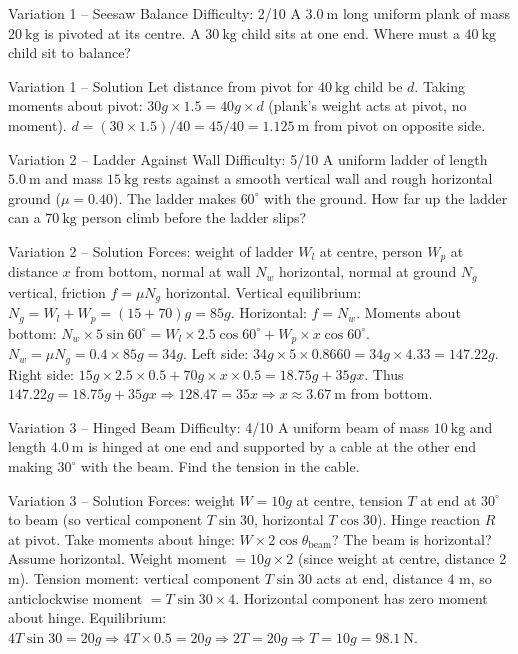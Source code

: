 \documentclass[11pt]{beamer}
\begin{document}
\begin{frame}[shrink=15]{Variation 1 – Seesaw Balance \hfill Difficulty: 2/10}
A $3.0\ \mathrm{m}$ long uniform plank of mass $20\ \mathrm{kg}$ is pivoted at its centre. A $30\ \mathrm{kg}$ child sits at one end. Where must a $40\ \mathrm{kg}$ child sit to balance?
\end{frame}

\begin{frame}{Variation 1 – Solution}
Let distance from pivot for $40\ \mathrm{kg}$ child be $d$. Taking moments about pivot:
$30g \times 1.5 = 40g \times d$ (plank's weight acts at pivot, no moment).
$d = (30\times1.5)/40 = 45/40 = 1.125\ \mathrm{m}$ from pivot on opposite side.
\end{frame}

\begin{frame}[shrink=15]{Variation 2 – Ladder Against Wall \hfill Difficulty: 5/10}
A uniform ladder of length $5.0\ \mathrm{m}$ and mass $15\ \mathrm{kg}$ rests against a smooth vertical wall and rough horizontal ground ($\mu = 0.40$). The ladder makes $60^\circ$ with the ground. How far up the ladder can a $70\ \mathrm{kg}$ person climb before the ladder slips?
\end{frame}

\begin{frame}[shrink=15]{Variation 2 – Solution}
Forces: weight of ladder $W_l$ at centre, person $W_p$ at distance $x$ from bottom, normal at wall $N_w$ horizontal, normal at ground $N_g$ vertical, friction $f = \mu N_g$ horizontal.
Vertical equilibrium: $N_g = W_l + W_p = (15+70)g = 85g$.
Horizontal: $f = N_w$.
Moments about bottom: $N_w \times 5\sin60^\circ = W_l \times 2.5\cos60^\circ + W_p \times x\cos60^\circ$.
$N_w = \mu N_g = 0.4\times85g = 34g$.
Left side: $34g \times 5\times0.8660 = 34g \times 4.33 = 147.22g$.
Right side: $15g \times 2.5\times0.5 + 70g \times x\times0.5 = 18.75g + 35g x$.
Thus $147.22g = 18.75g + 35g x \Rightarrow 128.47 = 35x \Rightarrow x \approx 3.67\ \mathrm{m}$ from bottom.
\end{frame}

\begin{frame}[shrink=15]{Variation 3 – Hinged Beam \hfill Difficulty: 4/10}
A uniform beam of mass $10\ \mathrm{kg}$ and length $4.0\ \mathrm{m}$ is hinged at one end and supported by a cable at the other end making $30^\circ$ with the beam. Find the tension in the cable.
\end{frame}

\begin{frame}{Variation 3 – Solution}
Forces: weight $W = 10g$ at centre, tension $T$ at end at $30^\circ$ to beam (so vertical component $T\sin30$, horizontal $T\cos30$). Hinge reaction $R$ at pivot. Take moments about hinge: $W \times 2\cos\theta_{\text{beam}}$? The beam is horizontal? Assume horizontal. Weight moment $= 10g \times 2$ (since weight at centre, distance 2 m). Tension moment: vertical component $T\sin30$ acts at end, distance $4$ m, so anticlockwise moment $= T\sin30 \times 4$. Horizontal component has zero moment about hinge. Equilibrium: $4T\sin30 = 20g \Rightarrow 4T\times0.5 = 20g \Rightarrow 2T = 20g \Rightarrow T = 10g = 98.1\ \mathrm{N}$.
\end{frame}
\end{document}
